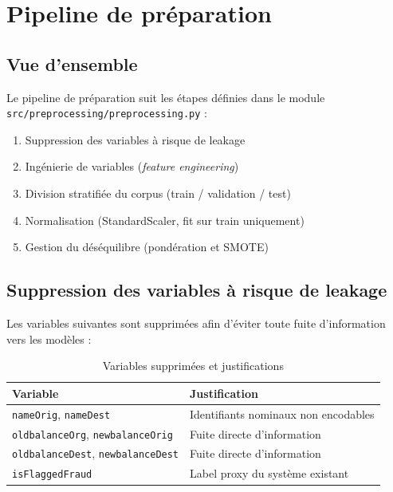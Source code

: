 \documentclass[12pt,a4paper,twoside]{report}
\begin{document}
\section{Pipeline de préparation}

\subsection{Vue d'ensemble}

Le pipeline de préparation suit les étapes définies dans le module \texttt{src/preprocessing/preprocessing.py} :

\begin{enumerate}
  \item Suppression des variables à risque de leakage
  \item Ingénierie de variables (\textit{feature engineering})
  \item Division stratifiée du corpus (train / validation / test)
  \item Normalisation (StandardScaler, fit sur train uniquement)
  \item Gestion du déséquilibre (pondération et SMOTE)
\end{enumerate}

\subsection{Suppression des variables à risque de leakage}

Les variables suivantes sont supprimées afin d'éviter toute fuite d'information vers les modèles :

\begin{table}[H]
\centering
\caption{Variables supprimées et justifications}
\label{tab:cols_dropped}
\begin{tabular}{ll}
\toprule
\textbf{Variable} & \textbf{Justification} \\
\midrule
\texttt{nameOrig}, \texttt{nameDest} & Identifiants nominaux non encodables \\
\texttt{oldbalanceOrg}, \texttt{newbalanceOrig} & Fuite directe d'information \\
\texttt{oldbalanceDest}, \texttt{newbalanceDest} & Fuite directe d'information \\
\texttt{isFlaggedFraud} & Label proxy du système existant \\
\bottomrule
\end{tabular}
\end{table}
\end{document}
